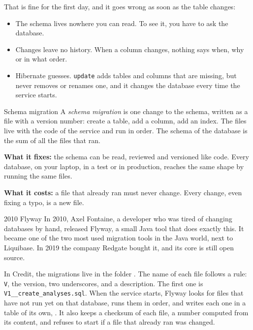 That is fine for the first day, and it goes wrong as soon as the table
changes:

\begin{itemize}
  \item The schema lives nowhere you can read. To see it, you have to ask the
        database.
  \item Changes leave no history. When a column changes, nothing says when,
        why or in what order.
  \item Hibernate guesses. \texttt{update} adds tables and columns that are
        missing, but never removes or renames one, and it changes the
        database every time the service starts.
\end{itemize}

\begin{concept}{Schema migration}
A \emph{schema migration} is one change to the schema, written as a file
with a version number: create a table, add a column, add an index. The files
live with the code of the service and run in order. The schema of the
database is the sum of all the files that ran.

\textbf{What it fixes:} the schema can be read, reviewed and versioned like
code. Every database, on your laptop, in a test or in production, reaches the
same shape by running the same files.

\textbf{What it costs:} a file that already ran must never change. Every
change, even fixing a typo, is a new file.
\end{concept}

\begin{history}{2010 \textperiodcentered{} Flyway}
In 2010, Axel Fontaine, a developer who was tired of changing databases by
hand, released Flyway, a small Java tool that does exactly this. It became
one of the two most used migration tools in the Java world, next to
Liquibase. In 2019 the company Redgate bought it, and its core is still open
source.
\end{history}

In Credit, the migrations live in the folder
. The name of each file follows a rule:
\texttt{V}, the version, two underscores, and a description. The first one
is \texttt{V1\_\_create\_analyses.sql}. When the service starts, Flyway looks
for files that have not run yet on that database, runs them in order, and
writes each one in a table of its own, . It also
keeps a checksum of each file,
a number computed from its content, and refuses to start if a file that
already ran was changed.

